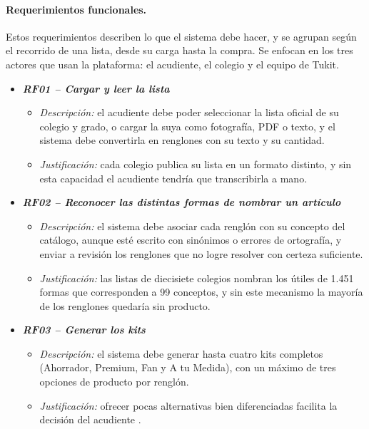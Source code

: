
\paragraph{Requerimientos funcionales.} Estos requerimientos describen lo que el sistema
debe hacer, y se agrupan según el recorrido de una lista, desde su carga hasta la compra.
Se enfocan en los tres actores que usan la plataforma: el acudiente, el colegio y el equipo
de Tukit.\par

\begin{itemize}
  \item \textbf{\textit{RF01 -- Cargar y leer la lista}}
    \begin{itemize}
      \item \textit{Descripción:} el acudiente debe poder seleccionar la lista oficial de su
            colegio y grado, o cargar la suya como fotografía, PDF o texto, y el sistema
            debe convertirla en renglones con su texto y su cantidad.
      \item \textit{Justificación:} cada colegio publica su lista en un formato distinto, y
            sin esta capacidad el acudiente tendría que transcribirla a mano.
    \end{itemize}

  \item \textbf{\textit{RF02 -- Reconocer las distintas formas de nombrar un artículo}}
    \begin{itemize}
      \item \textit{Descripción:} el sistema debe asociar cada renglón con su concepto del
            catálogo, aunque esté escrito con sinónimos o errores de ortografía, y enviar a
            revisión los renglones que no logre resolver con certeza suficiente.
      \item \textit{Justificación:} las listas de diecisiete colegios nombran los útiles de
            1.451 formas que corresponden a 99 conceptos, y sin este mecanismo la mayoría de
            los renglones quedaría sin producto.
    \end{itemize}

  \item \textbf{\textit{RF03 -- Generar los kits}}
    \begin{itemize}
      \item \textit{Descripción:} el sistema debe generar hasta cuatro kits completos
            (Ahorrador, Premium, Fan y A tu Medida), con un máximo de tres opciones de
            producto por renglón.
      \item \textit{Justificación:} ofrecer pocas alternativas bien diferenciadas facilita la
            decisión del acudiente \citep{iyengar_when_2000}.
    \end{itemize}


\end{itemize}
